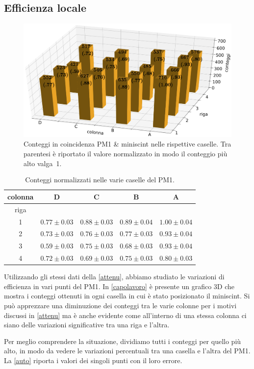 \subsection{Efficienza locale}
\label{localis}

\begin{figure}
	\includegraphics[width=\textwidth]{3d_grande}
	\caption{Conteggi in coincidenza PM1 \& miniscint nelle rispettive caselle.
	Tra parentesi è riportato il valore normalizzato in modo il conteggio più alto valga~1.}
	\label{capolavoro}
\end{figure}

\begin{table}
\centering
\begin{tabular}{|c|c|c|c|c|}
\hline
colonna & D & C & B & A \\
 \hline
riga  & & & &  \\
1 & $ 0.77 \pm 0.03 $ & $ 0.88 \pm 0.03 $ & $ 0.89 \pm 0.04 $ & $ 1.00 \pm 0.04 $ \\ 
2 & $ 0.73 \pm 0.03 $ & $ 0.76 \pm 0.03 $ & $ 0.77 \pm 0.03 $ & $ 0.93 \pm 0.04 $ \\ 
3 & $ 0.59 \pm 0.03 $ & $ 0.75 \pm 0.03 $ & $ 0.68 \pm 0.03 $ & $ 0.93 \pm 0.04 $ \\ 
4 & $ 0.72 \pm 0.03 $ & $ 0.69 \pm 0.03 $ & $ 0.75 \pm 0.03 $ & $ 0.80 \pm 0.03 $ \\ 
\hline 
\end{tabular}
\caption{Conteggi normalizzati nelle varie caselle del PM1.}
\label{auto}
\end{table}

Utilizzando gli stessi dati della \autoref{attenu}, abbiamo studiato le variazioni di efficienza in vari punti del PM1. In \autoref{capolavoro} è presente un grafico 3D che mostra i conteggi ottenuti in ogni casella in cui è stato posizionato il miniscint. Si può apprezzare una diminuzione dei conteggi tra le varie colonne per i motivi discussi in \autoref{attenu} ma è anche evidente come all'interno di una stessa colonna ci siano delle variazioni significative tra una riga e l'altra.

Per meglio comprendere la situazione, dividiamo tutti i conteggi per quello più alto,
in modo da vedere le variazioni percentuali tra una casella e l'altra del PM1.
La \autoref{auto} riporta i valori dei singoli punti con il loro errore.
